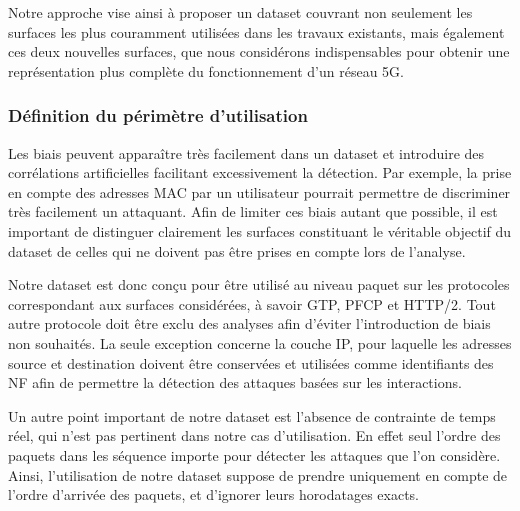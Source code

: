 \documentclass[a4paper,11pt,twoside]{StyleThese}
\begin{document}
Notre approche vise ainsi à proposer un dataset couvrant non seulement les surfaces les plus couramment utilisées dans les travaux existants, mais également ces deux nouvelles surfaces, que nous considérons indispensables pour obtenir une représentation plus complète du fonctionnement d'un réseau 5G.


\subsubsection{Définition du périmètre d’utilisation}
Les biais peuvent apparaître très facilement dans un dataset et introduire des corrélations artificielles facilitant excessivement la détection. Par exemple, la prise en compte des adresses MAC par un utilisateur pourrait permettre de discriminer très facilement un attaquant. Afin de limiter ces biais autant que possible, il est important de distinguer clairement les surfaces constituant le véritable objectif du dataset de celles qui ne doivent pas être prises en compte lors de l’analyse.

Notre dataset est donc conçu pour être utilisé au niveau paquet sur les protocoles correspondant aux surfaces considérées, à savoir GTP, PFCP et HTTP/2. Tout autre protocole doit être exclu des analyses afin d’éviter l’introduction de biais non souhaités. La seule exception concerne la couche IP, pour laquelle les adresses source et destination doivent être conservées et utilisées comme identifiants des NF afin de permettre la détection des attaques basées sur les interactions. 

Un autre point important de notre dataset est l’absence de contrainte de temps réel, qui n'est pas pertinent dans notre cas d'utilisation. En effet seul l'ordre des paquets dans les séquence importe pour détecter les attaques que l'on considère. Ainsi, l’utilisation de notre dataset suppose de prendre uniquement en compte de l’ordre d’arrivée des paquets, et d'ignorer leurs horodatages exacts.
\end{document}
